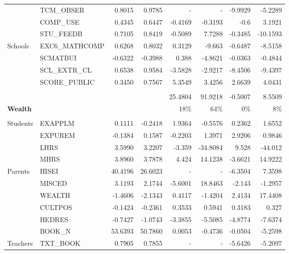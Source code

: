 \documentclass[10pt]{article}
\begin{document}
\begin{table}[htbp]
\begin{tabular}{llrrrrrr}
          & TCM\_OBSER & 0.8015 & 0.9785 & -     & -     & -9.9929 & -5.2289 \\[0.4em]
          & COMP\_USE & 0.4345 & 0.6447 & -0.4169 & -0.3193 & -0.6  & 3.1921 \\[0.4em]
          & STU\_FEEDB & 0.7105 & 0.8419 & -0.5089 & 7.7288 & -0.3485 & -10.1593 \\[0.4em]
    Schools & EXC6\_MATHCOMP & 0.6268 & 0.8032 & 0.3129 & -9.663 & -0.6487 & -8.5158 \\[0.4em]
          & SCMATBUI & -0.6322 & -0.3988 & 0.388 & -4.8621 & -0.0363 & -0.4844 \\[0.4em]
          & SCL\_EXTR\_CL & 0.6538 & 0.9584 & -3.5828 & -2.9217 & -8.4506 & -9.4397 \\[0.4em]
          & SCORE\_PUBLIC & 0.3450 & 0.7567 & 5.3549 & 3.4256 & 2.6639 & 4.0431 \\[0.4em]    
          		\cline{5-8} \\
			&       &       &       & 25.4804 & 91.9218 & -0.5007 & 8.5509 \\ [0.4em]        	
    \textbf{Wealth} &       & \multicolumn{1}{c}{\textit{}} & \multicolumn{1}{c}{\textit{}} & 18\%  & 64\%  & 0\%   & 8\% \\
    \cline{5-8} \\
    Students & EXAPPLM & 0.1111 & -0.2418 & 1.9364 & -0.5576 & 0.2362 & 1.6552 \\[0.4em]
          & EXPUREM & -0.1384 & 0.1587 & -0.2203 & 1.3971 & 2.9206 & 0.9846 \\[0.4em]
          & LHRS  & 3.5990 & 3.2207 & -3.359 & -34.8084 & 9.528 & -44.012 \\[0.4em]
          & MHRS  & 3.8960 & 3.7878 & 4.424 & 14.1238 & -3.6621 & 14.9222 \\[0.4em]
    Parents & HISEI & 40.4196 & 26.6023 & -     & -     & -6.3504 & 7.3598 \\[0.4em]
          & MISCED & 3.1193 & 2.1744 & -5.6001 & 18.8463 & -2.143 & -1.2957 \\[0.4em]
          & WEALTH & -1.4606 & -2.1343 & 0.4117 & -1.4204 & 2.4134 & 17.4408 \\[0.4em]
          & CULTPOS & -0.1424 & -0.2361 & 0.3533 & 0.5941 & 0.3183 & 0.327 \\[0.4em]
          & HEDRES & -0.7427 & -1.0743 & -3.3855 & -5.5085 & -4.8774 & -7.6374 \\[0.4em]
          & BOOK\_N & 53.6393 & 50.7860 & 0.0053 & -0.4736 & -0.0504 & -5.2598 \\[0.4em]
    Teachers & TXT\_BOOK & 0.7905 & 0.7855 & -     & -     & -5.6426 & -5.2097 \\[0.4em]

\end{tabular}
\end{table}
\end{document}
